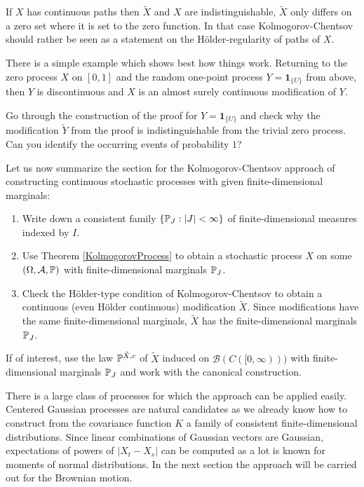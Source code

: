 \begin{laufmerksamkeit}
	If $X$ has continuous paths then $\tilde X$ and $X$ are indistinguishable, $\tilde X$ only differs on a zero set where it is set to the zero function. In that case Kolmogorov-Chentsov should  rather be seen as a statement on the H\"older-regularity of paths of $X$.
\end{laufmerksamkeit}
There is a simple example which shows best how things work. Returning to the zero process $X$ on $[0,1]$ and the random one-point process $Y=\mathbf 1_{\{U\}}$ from above, then $Y$ is discontinuous and $X$ is an almost surely continuous modification of $Y$. 
\begin{luebung}
	Go through the construction of the proof for $Y=\mathbf 1_{\{U\}}$ and check why the modification $\tilde Y$ from the proof is indistinguishable from the trivial zero process. Can you identify the occurring events of probability $1$? \smallskip
\end{luebung}
Let us now summarize the section for the Kolmogorov-Chentsov approach of constructing continuous stochastic processes with given finite-dimensional marginals:
\begin{lWarnhinweis}
	\begin{enumerate}[label=(\roman*)]
		\item Write down a consistent family $\{\P_J:|J|<\infty\}$ of finite-dimensional measures indexed by $I$.
		\item Use Theorem \ref{KolmogorovProcess} to obtain a stochastic process $X$ on some $(\Omega, \mathcal A, \P)$ with finite-dimensional marginals $\P_J$.
		\item Check the H\"older-type condition of Kolmogorov-Chentsov to obtain a continuous (even H\"older continuous) modification $\tilde X$. Since modifications have the same finite-dimensional marginals, $\tilde X$ has the finite-dimensional marginals $\P_J$. 
		\end{enumerate}
		If of interest, use the law $\P^{\tilde X,c}$ of $\tilde X$ induced on $\mathcal B(C([0,\infty)))$ with finite-dimensional marginals $\P_J$ and work with the canonical construction.
	\end{lWarnhinweis}
	There is a large class of processes for which the approach can be applied easily. Centered Gaussian processes are natural candidates as we already know how to construct from the covariance function $K$ a family of consistent finite-dimensional distributions. Since linear combinations of Gaussian vectors are Gaussian, expectations of powers of $|X_t-X_s|$ can be computed as a lot is known for moments of normal distributions. In the next section the approach will be carried out for the Brownian motion.


